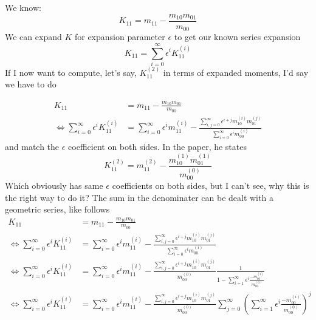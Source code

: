 \documentclass{article}
\begin{document}
We know:
\begin{equation}
  K_{11} = m_{11} - \frac{m_{10}m_{01}}{m_{00}}
\end{equation}
We can expand $K$ for expansion parameter $\epsilon$ to get our known series expansion
\begin{equation}
  K_{11} = \sum_{i=0}^\infty \epsilon^i K_{11}^{(i)}
\end{equation}
If I now want to compute, let's say, $K_{11}^{(2)}$ in terms of expanded moments, I'd say we have to do

\begin{equation}
  \begin{aligned}
    K_{11} & = m_{11} - \frac{m_{10}m_{01}}{m_{00}}\\
    \Leftrightarrow
    \sum_{i=0}^\infty \epsilon^i K_{11}^{(i)}
    & = \sum_{i=0}^\infty \epsilon^i m_{11}^{(i)} -
    \frac{\sum_{i,j=0}^\infty \epsilon^{i+j} m_{10}^{(i)}m_{01}^{(j)}}
         {\sum_{i=0}^\infty \epsilon^i m_{00}^{(i)}}
  \end{aligned}
\end{equation}
and match the $\epsilon$ coefficient on both sides.
In the paper, he states
\begin{equation}
  K_{11}^{(2)}
  = m_{11}^{(2)} -
  \frac{m_{10}^{(1)}m_{01}^{(1)}}
       {m_{00}^{(0)}}
\end{equation}
Which obviously has same $\epsilon$ coefficients on both sides, but I can't see, why this is the right way to do it?
The sum in the denominater can be dealt with a geometric series, like follows
\begin{equation}
  \begin{aligned}
    K_{11} & = m_{11} - \frac{m_{10}m_{01}}{m_{00}}\\
    \Leftrightarrow
    \sum_{i=0}^\infty \epsilon^i K_{11}^{(i)}
    & = \sum_{i=0}^\infty \epsilon^i m_{11}^{(i)} -
    \frac{\sum_{i,j=0}^\infty \epsilon^{i+j} m_{10}^{(i)}m_{01}^{(j)}}
        {\sum_{i=0}^\infty \epsilon^i m_{00}^{(i)}}\\
    \Leftrightarrow
    \sum_{i=0}^\infty \epsilon^i K_{11}^{(i)}
    & = \sum_{i=0}^\infty \epsilon^i m_{11}^{(i)} -
    \frac{\sum_{i,j=0}^\infty \epsilon^{i+j} m_{10}^{(i)}m_{01}^{(j)}}
        {m_{00}^{(0)}}
        \frac{1}{1 - \sum_{i=1}^\infty \epsilon^i \frac{ - m_{00}^{(i)}}{ m_{00}^{(0)}}}\\
    \Leftrightarrow
    \sum_{i=0}^\infty \epsilon^i K_{11}^{(i)}
    & = \sum_{i=0}^\infty \epsilon^i m_{11}^{(i)} -
    \frac{\sum_{i,j=0}^\infty \epsilon^{i+j} m_{10}^{(i)}m_{01}^{(j)}}
        {m_{00}^{(0)}}
    \sum_{j=0}^\infty {\left(\sum_{i=1}^\infty \epsilon^i \frac{ - m_{00}^{(i)}}{ m_{00}^{(0)}}\right)}^j
  \end{aligned}
\end{equation}
\end{document}
